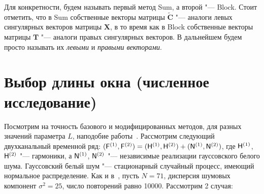 \documentclass[specialist,
substylefile = spbu_report.rtx,
subf,href,colorlinks=true, 12pt]{disser}
\newcommand{\toeplitz}{\widetilde{\mathbf{C}}}
\theoremstyle{definition}
\begin{document}
	Для конкретности, будем называть первый метод Sum, а второй "--- Block. Стоит отметить, что в Sum собственные векторы матрицы $\toeplitz$ "--- аналоги левых сингулярных векторов матрицы $\mathbf{X}$, в то время как в Block собственные векторы матрицы $\mathbf{T}$ "--- аналоги правых сингулярных векторов. В дальнейшем будем просто называть их \emph{левыми} и \emph{правыми векторами}.
	\section{Выбор длины окна (численное исследование)}
	Посмотрим на точность базового и модифицированных методов, для разных значений параметра $L$, наподобие работы~\cite{Golyandina_2015}. Рассмотрим следующий двухканальный временной ряд: $(\mathsf{F}^{(1)}, \mathsf{F}^{(2)})=(\mathsf{H}^{(1)},\mathsf{H}^{(2)}) + (\mathsf{N}^{(1)},\mathsf{N}^{(2)})$, где $\mathsf{H}^{(1)}$, $\mathsf{H}^{(2)}$ "--- гармоники, а $\mathsf{N}^{(1)}$, $\mathsf{N}^{(2)}$ "--- независимые реализации гауссовского белого шума. Гауссовский белый шум "--- стационарный случайный процесс, имеющий нормальное распределение. Как и в~\cite{Golyandina_2015}, пусть $N=71$, дисперсия шумовых компонент $\sigma^2=25$, число повторений равно 10000. Рассмотрим 2 случая:
	
\end{document}
